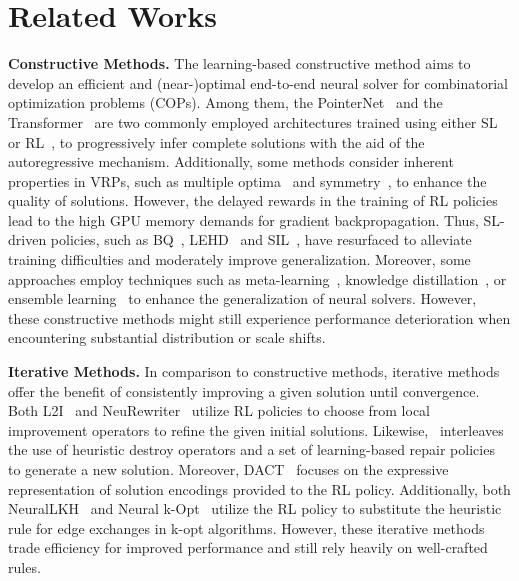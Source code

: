 \section{Related Works}
\textbf{Constructive Methods.} The learning-based constructive method aims to develop an efficient and (near-)optimal end-to-end neural solver for combinatorial optimization problems (COPs). Among them, the PointerNet~\cite{vinyals2015pointer} and the Transformer~\cite{kool2018attention} are two commonly employed architectures trained using either SL~\cite{vinyals2015pointer} or RL~\cite{nazari2018reinforcement, kool2018attention}, to progressively infer complete solutions with the aid of the autoregressive mechanism. Additionally, some methods consider inherent properties in VRPs, such as multiple optima~\cite{kwon2020pomo} and symmetry~\cite{kim2022sym}, to enhance the quality of solutions. However, the delayed rewards in the training of RL policies lead to the high GPU memory demands for gradient backpropagation. Thus, SL-driven policies, such as BQ~\cite{drakulic2024bq}, LEHD~\cite{luo2024neural} and SIL~\cite{luo2024self}, have resurfaced to alleviate training difficulties and moderately improve generalization. Moreover, some approaches employ techniques such as meta-learning~\cite{son2023meta, zhou2023towards, manchanda2022generalization, qiu2022dimes}, knowledge distillation~\cite{bi2022learning}, or ensemble learning~\cite{gao2023towards, jiang2024ensemble, grinsztajn2023winner} to enhance the generalization of neural solvers. However, these constructive methods might still experience performance deterioration when encountering substantial distribution or scale shifts.

\noindent \textbf{Iterative Methods.} In comparison to constructive methods, iterative methods offer the benefit of consistently improving a given solution until convergence. Both L2I~\cite{lu2019learning} and NeuRewriter~\cite{chen2019learning} utilize RL policies to choose from local improvement operators to refine the given initial solutions. Likewise,~\citet{hottung2020neural} interleaves the use of heuristic destroy operators and a set of learning-based repair policies to generate a new solution. Moreover, DACT~\cite{ma2021learning} focuses on the expressive representation of solution encodings provided to the RL policy. Additionally, both NeuralLKH~\cite{xin2021neurolkh} and Neural k-Opt~\cite{ma2024learning} utilize the RL policy to substitute the heuristic rule for edge exchanges in k-opt algorithms. However, these iterative methods trade efficiency for improved performance and still rely heavily on well-crafted rules.

